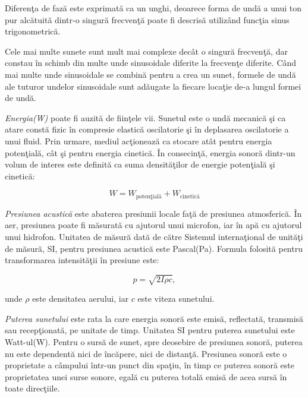	Diferen\c{t}a de faz\u{a} este exprimat\u{a} ca un unghi, deoarece forma de und\u{a} a unui ton pur alc\u{a}tuit\u{a} dintr-o singur\u{a} frecven\c{t}\u{a} poate fi descris\u{a} utiliz\^{a}nd func\c{t}ia sinus trigonometric\u{a}.
	\bigskip
	
	Cele mai multe sunete sunt mult mai complexe dec\^{a}t o singur\u{a} frecven\c{t}\u{a}, dar constau \^{i}n schimb din multe unde sinusoidale diferite la frecven\c{t}e diferite. C\^{a}nd mai multe unde sinusoidale se combin\u{a} pentru a crea un sunet, formele de und\u{a} ale tuturor undelor sinusoidale sunt ad\u{a}ugate la fiecare loca\c{t}ie de-a lungul formei de und\u{a}.
	\bigskip
	
	{\it{Energia(W)}} poate fi auzit\u{a} de fiin\c{t}ele vii. Sunetul este o und\u{a} mecanic\u{a} \c{s}i ca atare const\u{a} fizic \^{i}n compresie elastic\u{a} oscilatorie \c{s}i \^{i}n deplasarea oscilatorie a unui fluid. Prin urmare, mediul ac\c{t}ioneaz\u{a} ca stocare at\^{a}t pentru energia poten\c{t}ial\u{a}, c\^{a}t \c{s}i pentru energia cinetic\u{a}. \^{I}n consecin\c{t}\u{a}, energia sonor\u{a} dintr-un volum de interes este definit\u{a} ca suma densit\u{a}\c{t}ilor de energie poten\c{t}ial\u{a} \c{s}i cinetic\u{a}:
	
	\begin{equation}
	W = W_{\text{poten\c{t}ial\u{a}}} + W_{\text{cinetic\u{a}}}
	\end{equation} 
	\bigskip
	
	{\it{Presiunea acustic\u{a}}} este abaterea presiunii locale fa\c{t}\u{a} de presiunea atmosferic\u{a}. \^{I}n aer, presiunea poate fi m\u{a}surat\u{a} cu ajutorul unui microfon, iar \^{i}n ap\u{a} cu ajutorul unui hidrofon. Unitatea de m\u{a}sur\u{a} dat\u{a} de c\u{a}tre Sistemul interna\c{t}ional de unit\u{a}\c{t}i de m\u{a}sur\u{a}, SI, pentru presiunea acustic\u{a} este Pascal(Pa). Formula folosit\u{a} pentru transformarea intensit\u{a}\c{t}ii \^{i}n presiune este:
	
	\begin{equation}
	p = \sqrt{2 I \rho c}, 
	\end{equation}
	
	\noindent unde $\rho$ este densitatea aerului, iar $c$ este viteza sunetului.
	\bigskip
	
	{\it{Puterea sunetului}} este rata la care energia sonor\u{a} este emis\u{a}, reflectat\u{a}, transmis\u{a} sau recep\c{t}ionat\u{a}, pe unitate de timp. Unitatea SI pentru puterea sunetului este Watt-ul(W). Pentru o surs\u{a} de sunet, spre deosebire de presiunea sonor\u{a}, puterea nu este dependent\u{a} nici de \^{i}nc\u{a}pere, nici de distan\c{t}\u{a}. Presiunea sonor\u{a} este o proprietate a c\^{a}mpului \^{i}ntr-un punct din spa\c{t}iu, \^{i}n timp ce puterea sonor\u{a} este proprietatea unei surse sonore, egal\u{a} cu puterea total\u{a} emis\u{a} de acea surs\u{a} \^{i}n toate direc\c{t}iile.
	\bigskip
	
